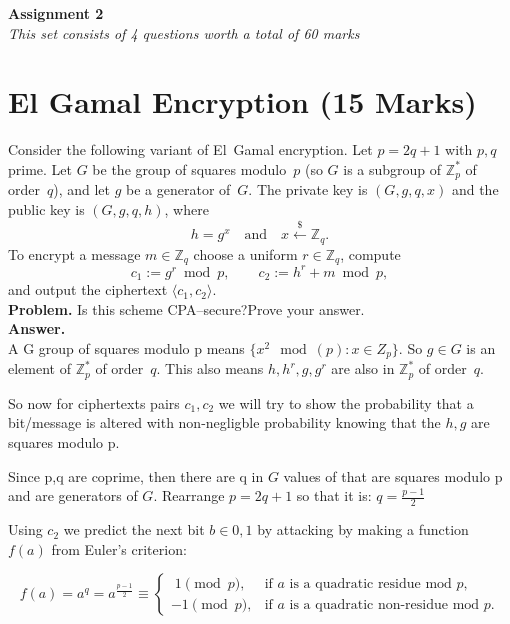 \documentclass[12pt]{article}
\newcommand{\Z}{\mathbb{Z}}
\newcommand{\Zp}{\Z_p^{\ast}}
\begin{document}
\begin{center}
    {\LARGE\bf Assignment 2}\\[0.5em]
    \large \emph{This set consists of 4 questions worth a total of 60 marks}
\end{center}

\section{El Gamal Encryption \hfill (15 Marks)}

Consider the following variant of El~Gamal encryption. Let $p = 2q + 1$ with $p, q$ prime.  Let $G$ be the group of squares modulo~$p$ (so $G$ is a subgroup of $\Zp$ of order~$q$), and let $g$ be a generator of~$G$.  The private key is $(G, g, q, x)$ and the public key is $(G, g, q, h)$, where
\[ h = g^{x}\quad \text{and}\quad x \stackrel{\$}{\leftarrow} \Z_q. \]
To encrypt a message $m \in \Z_q$ choose a uniform $r \in \Z_q$, compute
\[
    c_1 := g^{r} \bmod p, \qquad
    c_2 := h^{r} + m \bmod p,
\]
and output the ciphertext $\langle c_1, c_2 \rangle$.\\[0.25em]
\textbf{Problem.} Is this scheme CPA–secure?\;Prove your answer.
\\
\textbf{Answer.}
\\
A G group of squares modulo p means $\{x^2 \mod(p) : x \in Z_p\}$. So $g \in G$ is an element of
$\Zp$ of order~$q$. This also means $h, h^r, g, g^r$ are also in $\Zp$ of order~$q$. 

So now for ciphertexts pairs $c_1, c_2$ we will try to 
show the probability that a bit/message is altered
with non-negligble probability knowing that the $h,g$ are squares modulo p.

Since p,q are coprime, then there are q in $G$ values of that are squares modulo p 
and are generators of $G$. Rearrange $p = 2q + 1$ so that it is: $q = \frac{p - 1}{2}$ 

Using $c_2$ we predict the next bit $b \in {0,1}$ 
by attacking by making a function $f(a)$ from Euler's criterion:

\[
f(a) = a^{q} = a^{\frac{p-1}{2}} \equiv
\begin{cases}
\;1 \pmod{p}, & \text{if } a \text{ is a quadratic residue mod } p,\\[6pt]
-1 \pmod{p}, & \text{if } a \text{ is a quadratic non-residue mod } p.
\end{cases}
\]
\end{document}
